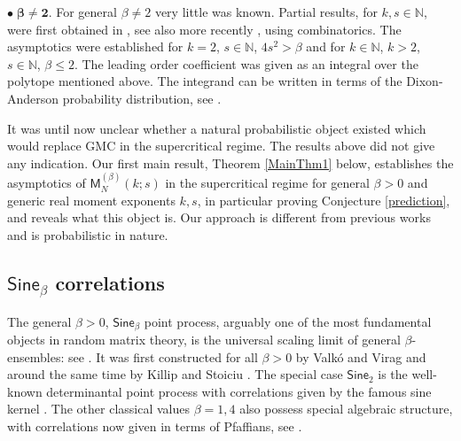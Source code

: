\documentclass[]{article}
\begin{document}
$\bullet \boldsymbol{\; \beta \neq 2}$. For general $\beta \neq 2$ very little was known. Partial results, for $k,s \in \mathbb{N}$, were first obtained in \cite{MoMCbetaE}, see also more recently \cite{forrester2025dualities}, using combinatorics. The asymptotics were established for $k=2$, $s \in \mathbb{N}$, $4s^2>\beta$ and for $k\in \mathbb{N}$, $k > 2$, $s\in \mathbb{N}$, $\beta \le 2$. The leading order coefficient was given as an integral over the polytope mentioned above. The integrand can be written in terms of the Dixon-Anderson probability distribution, see \cite{ForresterBook}. 


It was until now unclear whether a natural probabilistic object existed which would replace GMC in the supercritical regime. The results above did not give any indication. Our first main result, Theorem \ref{MainThm1} below, establishes the asymptotics of $\mathsf{M}^{(\beta)}_N(k;s)$ in the supercritical regime for general $\beta>0$ and generic real moment exponents $k, s$, in particular proving Conjecture \ref{prediction}, and reveals what this object is. Our approach is different from previous works and is probabilistic in nature.

\subsection{$\mathsf{Sine}_{\beta}$ correlations }

The general $\beta>0$, $\mathsf{Sine}_\beta$ point process, arguably one of the most fundamental objects in random matrix theory, is the universal scaling limit of general $\beta$-ensembles: see \cite{ValkoViragCarousel,KillipStoiciu,BourgadeBulk}. It was first constructed for all $\beta>0$ by Valk\'{o} and Virag  \cite{ValkoViragCarousel} and around the same time by Killip and Stoiciu \cite{KillipStoiciu}. The special case $\mathsf{Sine}_2$ is the well-known determinantal point process \cite{BorodinDet,JohanssonDet,ForresterBook} with correlations given by the famous sine kernel \cite{ForresterBook}. The other classical values $\beta=1,4$ also possess special algebraic structure, with correlations now given in terms of Pfaffians, see \cite{ForresterBook}. 
\end{document}
